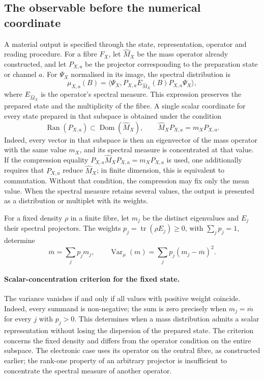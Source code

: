 \subsection{The observable before the numerical coordinate}
\label{subsec:vi-tipos-observable}

A material output is specified through the state, representation,
operator and reading procedure. For a fibre \(F_X\), let
\(\widehat M_X\) be the mass operator already constructed, and let \(P_{X,a}\)
be the projector corresponding to the preparation state or channel \(a\).
For \(\Psi_X\) normalised in its image, the spectral distribution is
\[
 \mu_{X,a}(B)
 =\langle\Psi_X,
   P_{X,a}E_{\widehat M_X}(B)P_{X,a}\Psi_X\rangle,
\]
where \(E_{\widehat M_X}\) is the operator's spectral measure. This
expression preserves the prepared state and the multiplicity of the fibre.
A single scalar coordinate for every state prepared in that subspace
is obtained under the condition
\[
 \operatorname{Ran}(P_{X,a})\subset\operatorname{Dom}(\widehat M_X),
 \qquad \widehat M_XP_{X,a}=m_XP_{X,a}.
\]
Indeed, every vector in that subspace is then an eigenvector of the
mass operator with the same value \(m_X\), and its spectral measure is
concentrated at that value. If the compression equality
\(P_{X,a}\widehat M_XP_{X,a}=m_XP_{X,a}\) is used, one additionally requires
that \(P_{X,a}\) reduce \(\widehat M_X\); in finite dimension, this is equivalent
to commutation. Without that condition, the compression may fix only
the mean value. When the spectral measure retains several values, the
output is presented as a distribution or multiplet with its weights.

For a fixed density \(\rho\) in a finite fibre, let \(m_j\)
be the distinct eigenvalues and \(E_j\) their spectral projectors.
The weights \(p_j=\operatorname{tr}(\rho E_j)\geq0\), with
\(\sum_jp_j=1\), determine
\[
 \overline m=\sum_jp_jm_j,\qquad
 \operatorname{Var}_{\mu}(m)=\sum_jp_j(m_j-\overline m)^2.
\]
\paragraph{Scalar-concentration criterion for the fixed state.}
The variance vanishes if and only if all values with positive weight
coincide. Indeed, every summand is non-negative; the sum is zero
precisely when \(m_j=\overline m\) for every \(j\) with
\(p_j>0\). This determines when a mass distribution admits
a scalar representation without losing the dispersion of the prepared state.
The criterion concerns the fixed density and differs from the
operator condition on the entire subspace. The electronic case uses its
operator on the central fibre, as constructed earlier;
the rank-one property of an arbitrary projector is insufficient to concentrate
the spectral measure of another operator.

